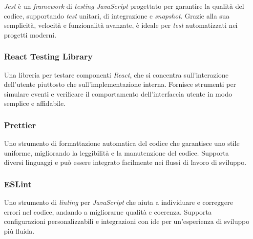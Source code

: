 \textit{Jest} è un \textit{framework} di \textit{testing JavaScript} progettato per garantire la qualità del codice, supportando \textit{test} unitari, di integrazione e \textit{snapshot}.
Grazie alla sua semplicità, velocità e funzionalità avanzate, è ideale per \textit{test} automatizzati nei progetti moderni.

\subsubsection{React Testing Library}

Una libreria per testare componenti \textit{React}, che si concentra sull'interazione dell'utente piuttosto che sull'implementazione interna. 
Fornisce strumenti per simulare eventi e verificare il comportamento dell'interfaccia utente in modo semplice e affidabile.

\subsubsection{Prettier}

Uno strumento di formattazione automatica del codice che garantisce uno stile uniforme, migliorando la leggibilità e la manutenzione del codice. 
Supporta diversi linguaggi e può essere integrato facilmente nei flussi di lavoro di sviluppo.

\subsubsection{ESLint}

Uno strumento di \textit{linting} per \textit{JavaScript} che aiuta a individuare e correggere errori nel codice, andando a migliorarne qualità e coerenza.
Supporta configurazioni personalizzabili e integrazioni con \gls{ide} per un'esperienza di sviluppo più fluida.


